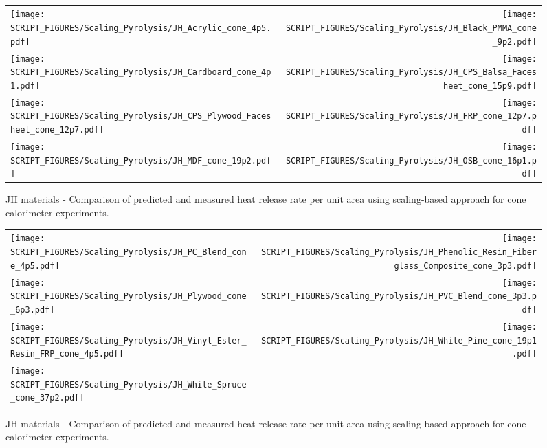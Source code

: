 \vspace{-0.4cm}
\\


\begin{figure}[p]
\begin{tabular*}{\textwidth}{l@{\extracolsep{\fill}}r}
\texttt{[image: SCRIPT\_FIGURES/Scaling\_Pyrolysis/JH\_Acrylic\_cone\_4p5.pdf]} &
\texttt{[image: SCRIPT\_FIGURES/Scaling\_Pyrolysis/JH\_Black\_PMMA\_cone\_9p2.pdf]} \\
\texttt{[image: SCRIPT\_FIGURES/Scaling\_Pyrolysis/JH\_Cardboard\_cone\_4p1.pdf]} &
\texttt{[image: SCRIPT\_FIGURES/Scaling\_Pyrolysis/JH\_CPS\_Balsa\_Facesheet\_cone\_15p9.pdf]} \\
\texttt{[image: SCRIPT\_FIGURES/Scaling\_Pyrolysis/JH\_CPS\_Plywood\_Facesheet\_cone\_12p7.pdf]} &
\texttt{[image: SCRIPT\_FIGURES/Scaling\_Pyrolysis/JH\_FRP\_cone\_12p7.pdf]} \\
\texttt{[image: SCRIPT\_FIGURES/Scaling\_Pyrolysis/JH\_MDF\_cone\_19p2.pdf]} &
\texttt{[image: SCRIPT\_FIGURES/Scaling\_Pyrolysis/JH\_OSB\_cone\_16p1.pdf]} \\
\end{tabular*}
\caption[HRRPUA of JH Materials using scaling model]
{JH materials - Comparison of predicted and measured heat release rate per unit area using scaling-based approach for cone calorimeter experiments.}
\label{JH_Materials_HRR}
\end{figure}

\begin{figure}[p]
\begin{tabular*}{\textwidth}{l@{\extracolsep{\fill}}r}
\texttt{[image: SCRIPT\_FIGURES/Scaling\_Pyrolysis/JH\_PC\_Blend\_cone\_4p5.pdf]} &
\texttt{[image: SCRIPT\_FIGURES/Scaling\_Pyrolysis/JH\_Phenolic\_Resin\_Fiberglass\_Composite\_cone\_3p3.pdf]} \\
\texttt{[image: SCRIPT\_FIGURES/Scaling\_Pyrolysis/JH\_Plywood\_cone\_6p3.pdf]} &
\texttt{[image: SCRIPT\_FIGURES/Scaling\_Pyrolysis/JH\_PVC\_Blend\_cone\_3p3.pdf]} \\
\texttt{[image: SCRIPT\_FIGURES/Scaling\_Pyrolysis/JH\_Vinyl\_Ester\_Resin\_FRP\_cone\_4p5.pdf]} &
\texttt{[image: SCRIPT\_FIGURES/Scaling\_Pyrolysis/JH\_White\_Pine\_cone\_19p1.pdf]} \\
\texttt{[image: SCRIPT\_FIGURES/Scaling\_Pyrolysis/JH\_White\_Spruce\_cone\_37p2.pdf]} &
\end{tabular*}
\caption[HRRPUA of JH Materials using scaling model]
{JH materials - Comparison of predicted and measured heat release rate per unit area using scaling-based approach for cone calorimeter experiments.}
\label{JH_Materials_HRR2}
\end{figure}

